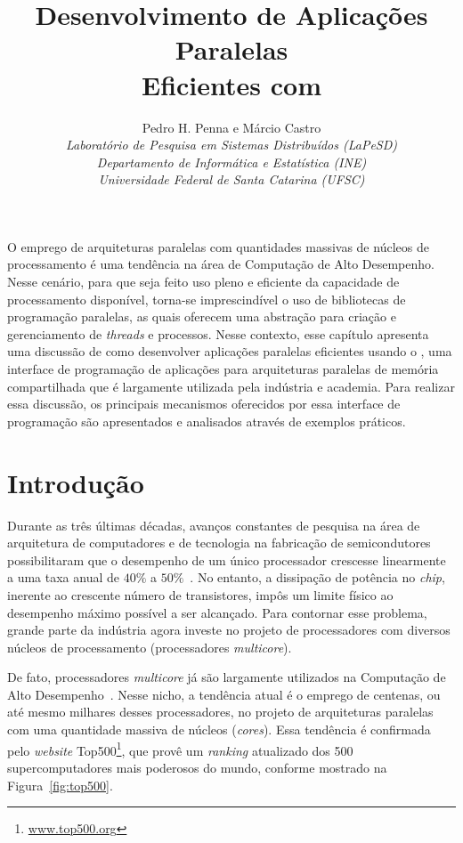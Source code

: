 \documentclass{SBCbookchapter}
\author{%
	Pedro H. Penna e Márcio Castro \\
	\textit{Laboratório de Pesquisa em Sistemas Distribuídos (LaPeSD)} \\
	\textit{Departamento de Informática e Estatística (INE)}           \\
	\textit{Universidade Federal de Santa Catarina (UFSC)}
}
\title{Desenvolvimento de Aplicações Paralelas\\Eficientes com \openmp}
\begin{document}
\maketitle

\begin{resumo}
	O emprego de arquiteturas paralelas com quantidades massivas de
	núcleos de processamento é uma tendência na área de Computação de
	Alto Desempenho. Nesse cenário, para que seja feito uso pleno e
	eficiente da capacidade de processamento disponível, torna-se
	imprescindível o uso de bibliotecas de programação paralelas, as
	quais oferecem uma abstração para criação e gerenciamento de
	\textit{threads} e processos. Nesse contexto, esse capítulo
	apresenta uma discussão de como desenvolver aplicações paralelas
	eficientes usando o \openmp, uma interface de programação de
	aplicações para arquiteturas paralelas de memória compartilhada que
	é largamente utilizada pela indústria e academia. Para realizar essa
	discussão, os principais mecanismos oferecidos por essa interface de
	programação são apresentados e analisados através de exemplos
	práticos.
\end{resumo}

\section{Introdução}

	Durante as três últimas décadas, avanços constantes de pesquisa na
	área de arquitetura de computadores e de tecnologia na fabricação de
	semicondutores possibilitaram que o desempenho de um único
	processador crescesse linearmente a uma taxa anual de $40\%$ a
	$50\%$~\cite{LARUS08}. No entanto, a dissipação de potência no
	\textit{chip}, inerente ao crescente número de transistores, impôs
	um limite físico ao desempenho máximo possível a ser alcançado.
	Para contornar esse problema, grande parte da indústria agora
	investe no projeto de processadores com diversos núcleos de
	processamento (processadores \textit{multicore}).

	De fato, processadores \textit{multicore} já são largamente
	utilizados na Computação de Alto Desempenho~\cite{Asanovic09}.
	Nesse nicho, a tendência atual é o emprego de centenas, ou até mesmo
	milhares desses processadores, no projeto de arquiteturas paralelas
	com uma quantidade massiva de núcleos (\textit{cores}). Essa
	tendência é confirmada pelo \textit{website}
	Top500\footnote{\url{www.top500.org}}, que provê um
	\textit{ranking} atualizado	dos 500 supercomputadores mais poderosos
	do mundo, conforme mostrado na Figura~\ref{fig:top500}.
		
\end{document}

